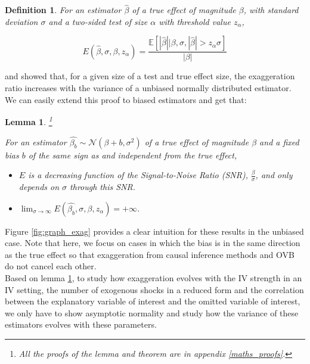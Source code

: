 \documentclass[usletter, 12pt]{article}
\newtheorem{lemma}{Lemma}
\newtheorem{definition}{Definition}
\begin{document}
		 	\begin{definition}\label{def_exagg}
		 		For an estimator $\hat{\beta}$ of a true effect of magnitude $\beta$, with standard deviation $\sigma$ and a two-sided test of size $\alpha$ with threshold value $z_{\alpha}$,
		 
				 \begin{equation}\label{exagg_general}
				 	E(\hat{\beta}, \sigma, \beta, z_{\alpha}) =
					 	\dfrac{\mathbb{E}\left[ | \hat{\beta} | \big| \beta, \sigma, |\hat{\beta}| > z_{\alpha} \sigma \right]}{| \beta |} 
				\end{equation}
			\end{definition}
			
			\cite{lu_note_2019} and \cite{zwet_significance_2021} showed that, for a given size of a test and true effect size, the exaggeration ratio increases with the variance of a unbiased normally distributed estimator. We can easily extend this proof to biased estimators and get that:
			
			\begin{lemma}\footnote{All the proofs of the lemma and theorem are in appendix \ref{maths_proofs}.}\label{lemma_evol_exagg}
			
				For an estimator $\hat{\beta_{b}}  \sim \mathcal{N}(\beta + b, \sigma^{2})$ of a true effect of magnitude $\beta$ and a fixed bias $b$ of the same sign as and independent from the true effect,
				
				\begin{itemize}
					\item $E$ is a decreasing function of the Signal-to-Noise Ratio (SNR), $\frac{\beta}{\sigma}$, and only depends on $\sigma$ through this SNR. 
					\item  $\lim_{\sigma\to \infty} E(\hat{\beta_{b}}, \sigma, \beta, z_{\alpha}) = +\infty$.
				\end{itemize}
			\end{lemma}
			
				Figure \ref{fig:graph_exag} provides a clear intuition for these results in the unbiased case. Note that here, we focus on cases in which the bias is in the same direction as the true effect so that exaggeration from causal inference methods and OVB do not cancel each other.\\
				 
				 Based on lemma \ref{lemma_evol_exagg}, to study how exaggeration evolves with the IV strength in an IV setting, the number of exogenous shocks in a reduced form and the correlation between the explanatory variable of interest and the omitted variable of interest, we only have to show asymptotic normality and study how the variance of these estimators evolves with these parameters.
				 				 
\end{document}
